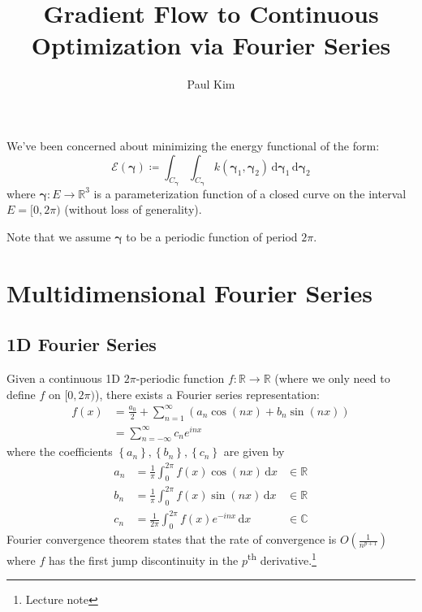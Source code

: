 \documentclass[a4paper]{article}
\title{Gradient Flow to Continuous Optimization via Fourier Series}
\author{Paul Kim}
\theoremstyle{definition}
\newcommand{\dx}{\, \text{d} x}
\newcommand{\dgammabf}{\, \text{d} \boldsymbol{\gamma}}
\begin{document}
\maketitle

We've been concerned about minimizing the energy functional of the form:
\begin{equation}
    \mathcal{E} (\boldsymbol{\gamma}) \coloneqq \int_{C_{\boldsymbol{\gamma}}} \int_{C_{\boldsymbol{\gamma}}} k\left( \boldsymbol{\gamma}_1, \boldsymbol{\gamma}_2 \right) \dgammabf_1 \dgammabf_2
\end{equation}
where $\boldsymbol{\gamma}: E \rightarrow \mathbb{R}^{3}$ is a parameterization function of a closed curve on the interval $E = [ 0, 2\pi )$ (without loss of generality).

Note that we assume $\boldsymbol{\gamma}$ to be a periodic function of period $2 \pi$.

\section{Multidimensional Fourier Series}
\subsection{1D Fourier Series}
Given a continuous 1D $2\pi$-periodic function $f: \mathbb{R} \rightarrow \mathbb{R}$ (where we only need to define $f$ on $[0, 2\pi)$), there exists a Fourier series representation:
\begin{align}
    f (x) &= \frac{a_0}{2} + \sum_{n = 1}^{\infty} \left( a_n \cos {\left( nx \right)} + b_n \sin {\left( nx \right)} \right) \\
    &= \sum_{n=-\infty}^{\infty} c_n e^{i n x}
\end{align}
where the coefficients $\left\{ a_n \right\}, \left\{ b_n \right\}, \left\{ c_n \right\}$ are given by
\begin{align}
    a_n &= \frac{1}{\pi} \int_{0}^{2\pi} f(x) \cos {\left( nx \right)} \dx &\in \mathbb{R}\\
    b_n &= \frac{1}{\pi} \int_{0}^{2\pi} f(x) \sin {\left( nx \right)} \dx &\in \mathbb{R} \\
    c_n &= \frac{1}{2 \pi} \int_{0}^{2\pi} f(x) e^{-inx} \dx &\in \mathbb{C}
\end{align}
Fourier convergence theorem states that the rate of convergence is $O\left( \frac{1}{n^{p+1}} \right)$ where $f$ has the first jump discontinuity in the $p$\textsuperscript{th} derivative.\footnote{Lecture note}
\end{document}
